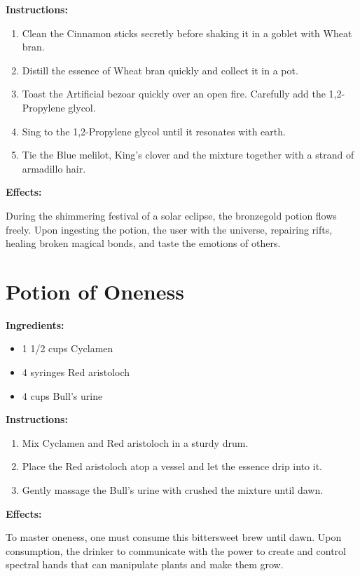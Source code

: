 \documentclass{article}
\begin{document}
\textbf{Instructions:}

\begin{enumerate}
  \item Clean the Cinnamon sticks secretly before shaking it in a goblet with Wheat bran.
  \item Distill the essence of Wheat bran quickly and collect it in a pot.
  \item Toast the Artificial bezoar quickly over an open fire. Carefully add the 1,2-Propylene glycol.
  \item Sing to the 1,2-Propylene glycol until it resonates with earth.
  \item Tie the Blue melilot, King's clover and the mixture together with a strand of armadillo hair.
\end{enumerate}

\textbf{Effects:}

During the shimmering festival of a solar eclipse, the bronzegold potion flows freely. Upon ingesting the potion, the user with the universe, repairing rifts, healing broken magical bonds, and taste the emotions of others.

\newpage
\section*{Potion of Oneness}

\textbf{Ingredients:}

\begin{itemize}
  \item 1 1/2 cups Cyclamen
  \item 4 syringes Red aristoloch
  \item 4 cups Bull's urine
\end{itemize}

\textbf{Instructions:}

\begin{enumerate}
  \item Mix Cyclamen and Red aristoloch in a sturdy drum.
  \item Place the Red aristoloch atop a vessel and let the essence drip into it.
  \item Gently massage the Bull's urine with crushed the mixture until dawn.
\end{enumerate}

\textbf{Effects:}

To master oneness, one must consume this bittersweet brew until dawn. Upon consumption, the drinker to communicate with the power to create and control spectral hands that can manipulate plants and make them grow.
\end{document}
